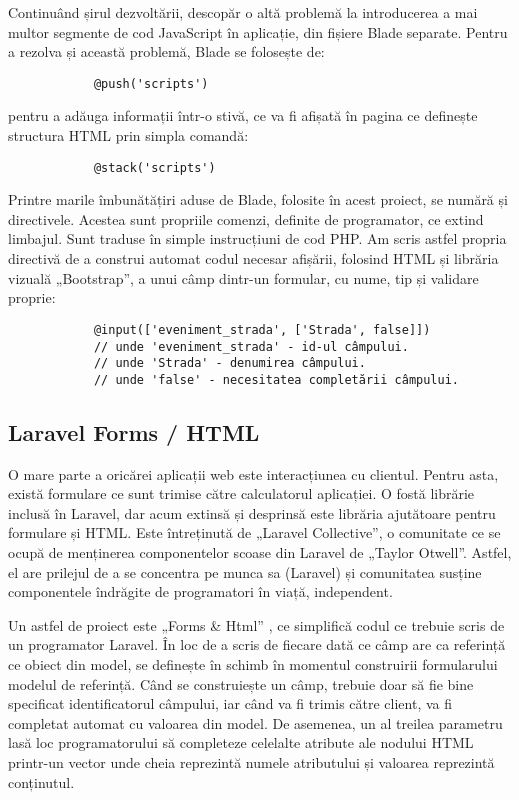 		Continuând șirul dezvoltării, descopăr o altă problemă la introducerea a mai multor segmente de cod JavaScript în aplicație, din fișiere Blade separate.
		Pentru a rezolva și această problemă, Blade se folosește de:
		\begin{Verbatim}
			@push('scripts')
		\end{Verbatim}
		pentru a adăuga informații într-o stivă, ce va fi afișată în pagina ce definește structura HTML prin simpla comandă:
		\begin{Verbatim}
			@stack('scripts')
		\end{Verbatim}

		Printre marile îmbunătățiri aduse de Blade, folosite în acest proiect, se numără și directivele.
		Acestea sunt propriile comenzi, definite de programator, ce extind limbajul.
		Sunt traduse în simple instrucțiuni de cod PHP.
		Am scris astfel propria directivă de a construi automat codul necesar afișării, folosind HTML și librăria vizuală „Bootstrap”, a unui câmp dintr-un formular, cu nume, tip și validare proprie:
		\begin{verbatim}
			@input(['eveniment_strada', ['Strada', false]])
			// unde 'eveniment_strada' - id-ul câmpului.
			// unde 'Strada' - denumirea câmpului.
			// unde 'false' - necesitatea completării câmpului.
		\end{verbatim}

	\subsection{Laravel Forms / HTML}


		O mare parte a oricărei aplicații web este interacțiunea cu clientul.
		Pentru asta, există formulare ce sunt trimise către calculatorul aplicației.
		O fostă librărie inclusă în Laravel, dar acum extinsă și desprinsă este librăria ajutătoare pentru formulare și HTML.
		Este întreținută de „Laravel Collective”, o comunitate ce se ocupă de menținerea componentelor scoase din Laravel de „Taylor Otwell”.
		Astfel, el are prilejul de a se concentra pe munca sa (Laravel) și comunitatea susține componentele îndrăgite de programatori în viață, independent.\cite{laravel_collective_about}

		Un astfel de proiect este „Forms \& Html” \cite{laravel_collective_forms}, ce simplifică codul ce trebuie scris de un programator Laravel.
		În loc de a scris de fiecare dată ce câmp are ca referință ce obiect din model, se definește în schimb în momentul construirii formularului modelul de referință.
		Când se construiește un câmp, trebuie doar să fie bine specificat identificatorul câmpului, iar când va fi trimis către client, va fi completat automat cu valoarea din model.
		De asemenea, un al treilea parametru lasă loc programatorului să completeze celelalte atribute ale nodului HTML printr-un vector unde cheia reprezintă numele atributului și valoarea reprezintă conținutul.

